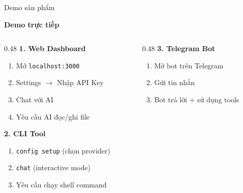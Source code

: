 \documentclass[aspectratio=169,12pt]{beamer}
\begin{document}
\begin{frame}{Demo sản phẩm}
    \begin{center}
        \textbf{\Large {} Demo trực tiếp}
    \end{center}

    \vspace{0.3cm}

    \begin{columns}[T]
        \begin{column}{0.48\textwidth}
            \textbf{ 1. Web Dashboard}
            \begin{enumerate}
                \item Mở \texttt{localhost:3000}
                \item Settings $\rightarrow$ Nhập API Key
                \item Chat với AI
                \item Yêu cầu AI đọc/ghi file
            \end{enumerate}

            \vspace{0.5cm}

            \textbf{ 2. CLI Tool}
            \begin{enumerate}
                \item \texttt{config setup} (chọn provider)
                \item \texttt{chat} (interactive mode)
                \item Yêu cầu chạy shell command
            \end{enumerate}
        \end{column}
        \begin{column}{0.48\textwidth}
            \textbf{ 3. Telegram Bot}
            \begin{enumerate}
                \item Mở bot trên Telegram
                \item Gửi tin nhắn
                \item Bot trả lời + sử dụng tools
            \end{enumerate}

            \vspace{0.5cm}


\end{column}
\end{columns}
\end{frame}
\end{document}
